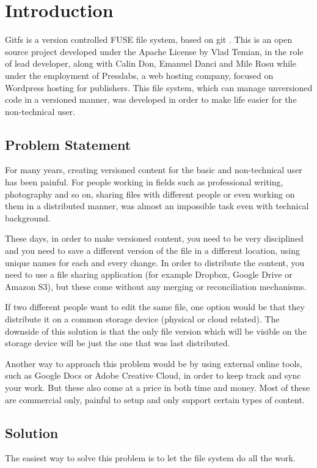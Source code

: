 
\chapter{Introduction}

Gitfs is a version controlled FUSE \cite{Rajgarhia2010} file system, based on git \cite{Spinellis2012}. This is an open source project developed under the Apache License \cite{Sinclair2010} by Vlad Temian, in the role of lead developer, along with Calin Don, Emanuel Danci and Mile Rosu while under the employment of Presslabs, a web hosting company, focused on Wordpress hosting for publishers. This file system, which can manage unversioned code in a versioned manner, was developed in order to make life easier for the non-technical user.

\section{Problem Statement}

For many years, creating versioned content for the basic and non-technical user has been painful. For people working in fields such as professional writing, photography and so on, sharing files with different people or even working on them in a distributed manner, was almost an impossible task even with technical background.

These days, in order to make versioned content, you need to be very disciplined and you need to save a different version of the file in a different location, using unique names for each and every change. In order to distribute the content, you need to use a file sharing application (for example Dropbox, Google Drive or Amazon S3), but these come without any merging or reconciliation mechanisms. 

If two different people want to edit the same file, one option would be that they distribute it on a common storage device (physical or cloud related). The downside of this solution is that the only file version which will be visible on the storage device will be just the one that was last distributed.

Another way to approach this problem would be by using external online tools, such as Google Docs or Adobe Creative Cloud, in order to keep track and sync your work. But these also come at a price in both time and money. Most of these are commercial only, painful to setup and only support certain types of content.

\section{Solution}
The easiest way to solve this problem is to let the file system do all the work.


